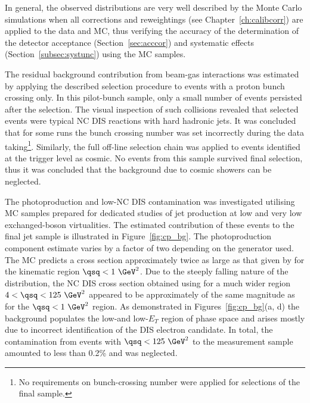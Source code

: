 In general, the observed distributions are very well described by the Monte Carlo simulations when all corrections and reweightings (see Chapter~\ref{ch:calibcorr}) are applied to the data and MC, thus verifying the accuracy of the determination of the detector acceptance (Section~\ref{sec:acccor}) and systematic effects (Section~\ref{subsec:systunc}) using the MC samples.

The residual background contribution from beam-gas interactions was estimated by applying the described selection procedure to events with a proton bunch crossing only. In this pilot-bunch sample, only a small number of events persisted after the selection. The visual inspection of such collisions revealed that selected events were typical NC DIS reactions with hard hadronic jets. It was concluded that for some runs the bunch crossing number was set incorrectly during the data taking\footnote{No requirements on bunch-crossing number were applied for selections of the final sample.}. Similarly, the full off-line selection chain was applied to events identified at the trigger level as cosmic. No events from this sample survived final selection, thus it was concluded that the background due to cosmic showers can be neglected.

The photoproduction and low-\qsq NC DIS contamination was investigated utilising MC samples prepared for dedicated studies of jet production at low and very low exchanged-boson virtualities. The estimated contribution of these events to the final jet sample is illustrated in Figure~\ref{fig:cp_bg}. The photoproduction component estimate varies by a factor of two depending on the generator used. The \pythia MC predicts a cross section approximately twice as large as that given by \herwig for the kinematic region $\qsq < 1~\GeV^2$. Due to the steeply falling nature of the \qsq distribution, the NC DIS cross section obtained using \lepto for a much wider region $4< \qsq < 125~\GeV^2$ appeared to be approximately of the same magnitude as for the $\qsq < 1~\GeV^2$ region. As demonstrated in Figures~\ref{fig:cp_bg}(a, d) the background populates the low-\qsq and low-$E_T$ region of phase space and arises mostly due to incorrect identification of the DIS electron candidate. In total, the contamination from events with $\qsq < 125~\GeV^2$ to the measurement sample amounted to less than 0.2\% and was neglected.



